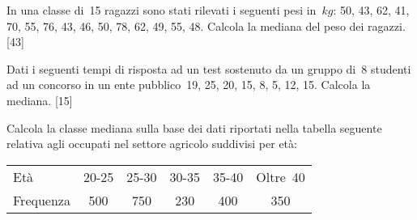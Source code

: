 \begin{esercizio}[\Ast]
\label{ese:A.31}
In una classe di~15 ragazzi sono stati rilevati i seguenti pesi 
in~$\unit{kg}$:
50, 43, 62, 41, 70, 55, 76, 43, 46, 50, 78, 62, 49, 55, 48.
Calcola la mediana del peso dei ragazzi.
\hfill [43]
\end{esercizio}

\begin{esercizio}[\Ast]
\label{ese:A.32}
Dati i seguenti tempi di risposta ad un test sostenuto da un gruppo di~8 
studenti ad un concorso
in un ente pubblico~19, 25, 20, 15, 8, 5, 12, 15. Calcola la mediana.
\hfill [15]
\end{esercizio}

\begin{esercizio}
\label{ese:A.33}
Calcola la classe mediana sulla base dei dati riportati nella tabella 
seguente relativa agli occupati nel settore agricolo suddivisi per età:
\begin{center}
 \begin{tabular}{l*{5}{c}}
\toprule
Età & 20-25 & 25-30 & 30-35 & 35-40 & Oltre~40\\
Frequenza & 500 & 750 & 230 & 400 & 350\\
\bottomrule
\end{tabular}
\end{center}
\end{esercizio}

